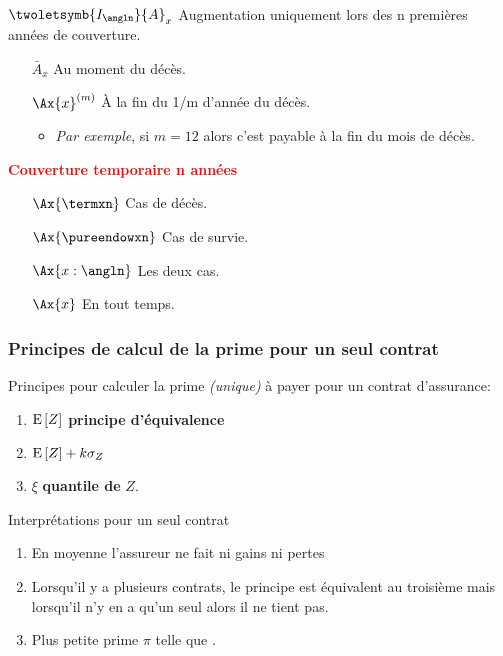 \documentclass[10pt, french]{article}
\begin{document}
\begin{multicols*}{3}
\textbf{{}}\\
$\twoletsymb{I_{\angln}}{A}_{x}$ Augmentation uniquement lors des n premières années de couverture.

\textbf{{}}
\begin{itemize}[leftmargin = .75cm]
	\item[$\bar{A}_x$] Au moment du décès.
	\item[$\Ax{x}^{(m)}$] À la fin du 1/m d'année du décès.
		\begin{itemize}
			\item	\textit{Par exemple}, si $m = 12$ alors c'est payable à la fin du mois de décès.
		\end{itemize}
\end{itemize}

\textbf{\textcolor{red}{Couverture temporaire n années}}
\begin{itemize}[leftmargin = .75cm]
	\item[$\Ax{\termxn}$] Cas de décès.
	\item[$\Ax{\pureendowxn}$] Cas de survie.
	\item[$\Ax{x:\angln}$] Les deux cas.
	\item[$\Ax{x}$] En tout temps.
\end{itemize}

\subsubsection*{Principes de calcul de la prime pour un seul contrat}
Principes pour calculer la prime \textit{(unique)} à payer pour un contrat d'assurance:
\begin{enumerate}
	\item $\mathrm{E} \left[ Z \right]$ \textbf{principe d'équivalence}
	\item $\mathrm{E} \left[ Z \right] + k \sigma_Z$
	\item $\xi$ \textbf{quantile de} $Z$.\\
\end{enumerate}

Interprétations pour un seul contrat
\begin{enumerate}
	\item En moyenne l'assureur ne fait ni gains ni pertes
	\item Lorsqu'il y a plusieurs contrats, le principe est équivalent au troisième mais lorsqu'il n'y en a qu'un seul alors il ne tient pas.
	\item Plus petite prime $\pi$ telle que .
\end{enumerate}


\end{multicols*}
\end{document}
